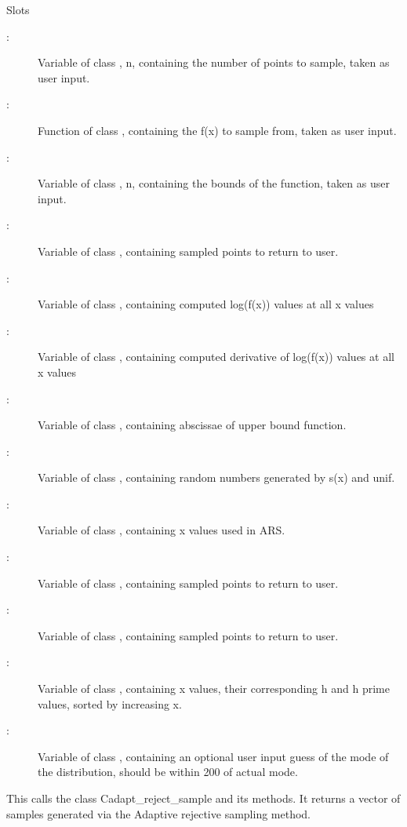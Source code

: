 \documentclass[a4paper]{book}
\begin{document}
%
\begin{Section}{Slots}
\begin{description}
 \item[:] Variable of class
, n, containing the number of points to
sample, taken as user input.\item[:] Function
of class , containing the f(x) to sample
from, taken as user input.
\item[:] Variable of class ,
n, containing the bounds of the function, taken as user
input.\item[:] Variable of class
, containing sampled points to return to
user.\item[:] Variable of class
, containing computed log(f(x)) values at
all x values\item[:] Variable of
class , containing computed derivative of
log(f(x)) values at all x values
\item[:] Variable of class ,
containing abscissae of upper bound function.
\item[:] Variable of class ,
containing random numbers generated by s(x) and unif.
\item[:] Variable of class ,
containing x values used in ARS.
\item[:] Variable of class ,
containing sampled points to return to user.
\item[:] Variable of class ,
containing sampled points to return to user.
\item[:] Variable of class
, containing x values, their corresponding
h and h prime values, sorted by increasing x.
\item[:] Variable of class
, containing an optional user input guess
of the mode of the distribution, should be within 200 of
actual mode.
\end{description}

\end{Section}
%
\begin{Description}\relax
This calls the class Cadapt\_reject\_sample and its
methods.  It returns a vector of samples generated via
the Adaptive rejective sampling method.
\end{Description}
\end{document}
